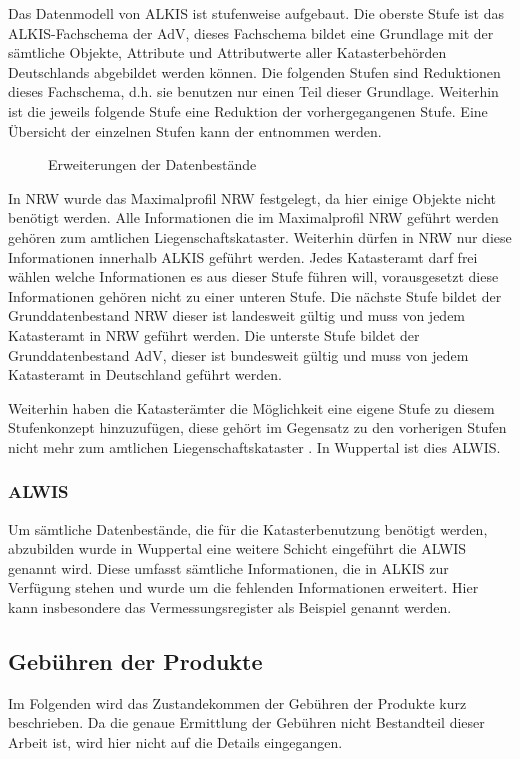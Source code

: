 Das Datenmodell von ALKIS ist stufenweise aufgebaut. Die oberste Stufe ist das ALKIS-Fachschema der AdV, dieses Fachschema bildet eine Grundlage mit der sämtliche Objekte, Attribute und Attributwerte aller Katasterbehörden Deutschlands abgebildet werden können.
Die folgenden Stufen sind Reduktionen dieses Fachschema, d.h. sie benutzen nur einen Teil dieser Grundlage. Weiterhin ist die jeweils folgende Stufe eine Reduktion der vorhergegangenen Stufe. Eine Übersicht der einzelnen Stufen kann der  entnommen werden. 

\begin{figure}[htbp]
	\centering
	\caption{Erweiterungen der Datenbestände}
	\label{fig:prod-stufen}
\end{figure}

In \ac{NRW} wurde das Maximalprofil NRW festgelegt, da hier einige Objekte nicht benötigt werden. Alle Informationen die im Maximalprofil NRW geführt werden gehören zum amtlichen Liegenschaftskataster.
Weiterhin dürfen in NRW nur diese Informationen innerhalb ALKIS geführt werden. Jedes Katasteramt darf frei wählen welche Informationen es aus dieser Stufe führen will, vorausgesetzt diese Informationen gehören nicht zu einer unteren Stufe.
Die nächste Stufe bildet der Grunddatenbestand NRW dieser ist landesweit gültig und muss von jedem Katasteramt in NRW geführt werden.
Die unterste Stufe bildet der Grunddatenbestand AdV, dieser ist bundesweit gültig und muss von jedem Katasteramt in Deutschland geführt werden.

Weiterhin haben die Katasterämter die Möglichkeit eine eigene Stufe zu diesem Stufenkonzept hinzuzufügen, diese gehört im Gegensatz zu den vorherigen Stufen nicht mehr zum amtlichen Liegenschaftskataster \autocite[vgl.][1-4]{bezk-grunddaten}. In Wuppertal ist dies \acs{ALWIS}.

\subsubsection{ALWIS}
Um sämtliche Datenbestände, die für die Katasterbenutzung benötigt werden, abzubilden wurde in Wuppertal eine weitere Schicht eingeführt die \acf{ALWIS} genannt wird. Diese umfasst sämtliche Informationen, die in ALKIS zur Verfügung stehen und wurde um die fehlenden Informationen erweitert. Hier kann insbesondere das Vermessungsregister als Beispiel genannt werden.

\subsection{Gebühren der Produkte} \label{subsec:gebuehren}
Im Folgenden wird das Zustandekommen der Gebühren der Produkte kurz beschrieben. Da die genaue Ermittlung der Gebühren nicht Bestandteil dieser Arbeit ist, wird hier nicht auf die Details eingegangen. 

